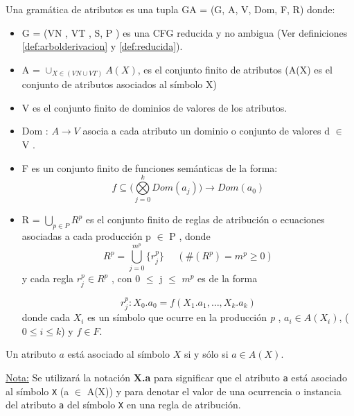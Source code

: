 \begin{definition}
\label{def:grammarattr}
Una gramática de atributos es una tupla GA = (G, A, V, Dom, F, R) donde:
\begin{itemize}
\item G = (VN , VT , S, P ) es una CFG reducida y no ambigua (Ver definiciones \ref{def:arbolderivacion} y \ref{def:reducida}).
\item A = $\cup_{X\in(VN \cup VT)} A(X)$, es el conjunto finito de atributos (A(X) es el conjunto de atributos asociados al símbolo X)

\item V es el conjunto finito de dominios de valores de los atributos.
\item Dom : $A\rightarrow V$ asocia a cada atributo un dominio o conjunto de valores d $\in$ V .
\item F es un conjunto finito de funciones semánticas de la forma:
\begin{equation}
f \subseteq (\bigotimes\limits_{j=0}^{k}{ Dom(a_{j} ))\rightarrow Dom(a_{0})}
\end{equation}

\item R = $\bigcup _{p \in P} R^{p}$ es el conjunto finito de reglas de atribución o ecuaciones asociadas a cada producción p $\in$ P , donde
\begin{equation}
R^{p} = \bigcup\limits_{j=0}^{m^{p}}{\{r_{j}^{p}\}}\ \ \ \ \ \ (\#(R^{p} ) = m^{p} \geq 0)
\end{equation}
y cada regla $r_{j}^{p} \in R^{p}$ , con 0 $\leq$ j $\leq$ $m^{p}$ es de la forma

\begin{equation}
r_{j}^{p}: X_{0}.a_{0} = f(X_{1}.a_{1} ,\dots , X_{k}.a_{k})
\end{equation} 
donde cada $X_{i}$ es un símbolo que ocurre en la producción \textit{p} , $a_{i} \in A(X_{i})$, ($0 \leqslant i \leqslant k$) y $f \in F$.

\end{itemize}
\end{definition}

\begin{definition} Un atributo $a$ está asociado al símbolo $X$ si y sólo si $a \in A(X)$. 
\end{definition}
\underline{Nota:}
Se utilizará la notación \textbf{X.a} para significar que el atributo \texttt{a} está asociado al símbolo \texttt{X} (a $\in$ A(X)) y para denotar el valor de una ocurrencia o instancia del atributo \texttt{a} del símbolo \texttt{X} en una regla de atribución.


